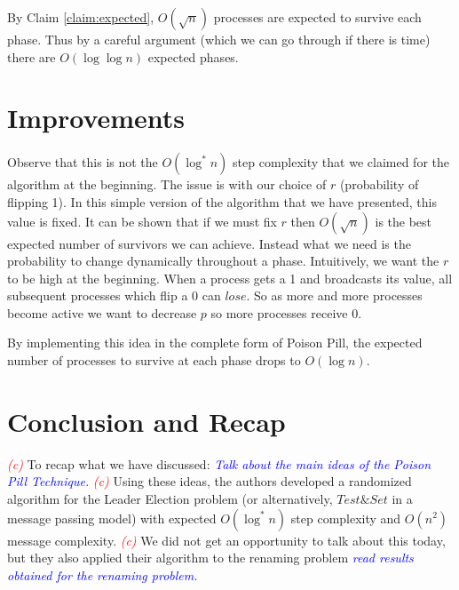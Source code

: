 \documentclass[
10pt, %
letterpaper, %
onecolumn, %
]{article}
\begin{document}
By Claim \ref{claim:expected}, $O(\sqrt{n})$ processes are expected to survive each phase. Thus by a careful argument (which we can go through if there is time) there are $O(\log \log n)$ expected phases. 


\section{Improvements}
Observe that this is not the $O(\log^* n)$ step complexity that we claimed for the algorithm at the beginning. The issue is with our choice of $r$ (probability of flipping 1). In this simple version of the algorithm that we have presented, this value is fixed. It can be shown that if we must fix $r$ then $O(\sqrt{n})$ is the best expected number of survivors we can achieve. Instead what we need is the probability to change dynamically throughout a phase. Intuitively, we want the $r$ to be high at the beginning. When a process gets a 1 and broadcasts its value, all subsequent processes which flip a 0 can $lose$. So as more and more processes become active we want to decrease $p$ so more processes receive 0.

By implementing this idea in the complete form of Poison Pill, the expected number of processes to survive at each phase drops to $O(\log n)$.   


\section{Conclusion and Recap}
\textcolor{red}{\emph{(c)}} To recap what we have discussed:  \textcolor{blue}{\emph{Talk about the main ideas of the Poison Pill Technique.}} \textcolor{red}{\emph{(c)}} Using these ideas, the authors developed a randomized algorithm for the Leader Election problem (or alternatively, $Test\&Set$ in a message passing model) with expected $O(\log^* n)$ step complexity and $O(n^2)$ message complexity. \textcolor{red}{\emph{(c)}} We did not get an opportunity to talk about this today, but they also applied their algorithm to the renaming problem \textcolor{blue}{\emph{read results obtained for the renaming problem.}}  


\end{document}
